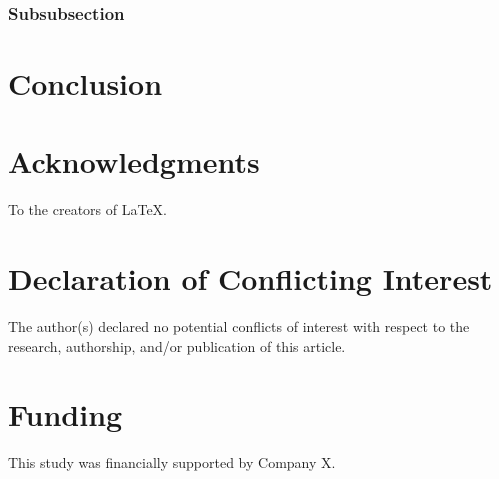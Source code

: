 \documentclass[fleqn,10pt]{JLA_article} %
\begin{document}
\subsubsection{Subsubsection}

\lipsum[14] %

\section{Conclusion}

\lipsum[15] %

\section*{Acknowledgments} %

To the creators of  \LaTeX.


\section*{Declaration of Conflicting Interest} %


The author(s) declared no potential conflicts of interest with respect to the research, authorship, and/or publication of this article.

\section*{Funding} %


This study was financially supported by Company X.


\printbibliography 

\end{document}
